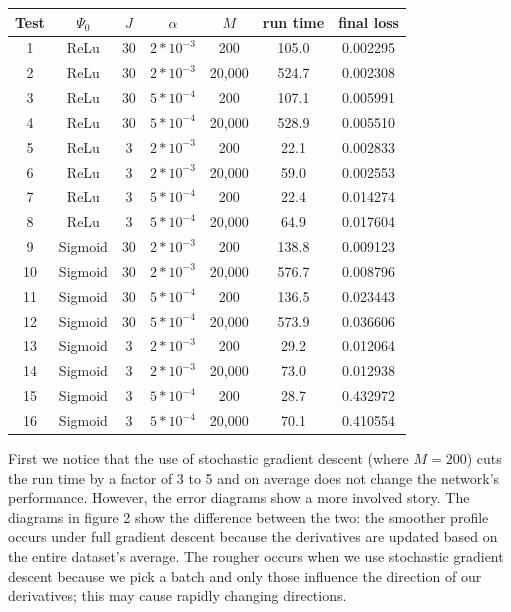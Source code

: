 \documentclass[reqno,14pt]{amsart}
\theoremstyle{plain}
\theoremstyle{definition}
\theoremstyle{remark}
\begin{document}
\begin{center}
\begin{tabular}{||c c c c c c c||} 
 \hline
 Test & $\Psi_0$ & $J$ & $\alpha$ & $M$ & run time & final loss \\ [0.5ex] 
 \hline\hline
 1 & ReLu &  30 & $2*10^{-3}$ & 200 & 105.0 & 0.002295\\ 
 \hline
 2 & ReLu & 30 & $2*10^{-3}$ & 20,000 & 524.7 & 0.002308\\
 \hline
 3 & ReLu & 30 & $5*10^{-4}$ & 200 & 107.1 & 0.005991\\
 \hline
 4 & ReLu & 30 & $5*10^{-4}$ & 20,000 & 528.9 & 0.005510\\
 \hline
 5 & ReLu & 3 & $2*10^{-3}$ & 200 & 22.1 & 0.002833\\
 \hline
 6 & ReLu & 3 & $2*10^{-3}$ & 20,000 & 59.0 & 0.002553\\
 \hline 
 7 & ReLu & 3 & $5*10^{-4}$ & 200 & 22.4 & 0.014274\\
 \hline
 8 & ReLu & 3 & $5*10^{-4}$ & 20,000 & 64.9 & 0.017604\\
 \hline
 9 & Sigmoid &  30 & $2*10^{-3}$ & 200 & 138.8 & 0.009123\\ 
 \hline
 10 & Sigmoid & 30 & $2*10^{-3}$ & 20,000 & 576.7 & 0.008796\\
 \hline
 11 & Sigmoid & 30 & $5*10^{-4}$ & 200 & 136.5 & 0.023443\\
 \hline
 12 & Sigmoid & 30 & $5*10^{-4}$ & 20,000 & 573.9 & 0.036606\\
 \hline
 13 & Sigmoid & 3 & $2*10^{-3}$ & 200 & 29.2 & 0.012064\\
 \hline
 14 & Sigmoid & 3 & $2*10^{-3}$ & 20,000 & 73.0 & 0.012938\\
 \hline 
 15 & Sigmoid & 3 & $5*10^{-4}$ & 200 & 28.7 & 0.432972\\
 \hline
 16 & Sigmoid & 3 & $5*10^{-4}$ & 20,000 & 70.1 & 0.410554\\[1ex] 
 \hline
\end{tabular}
\end{center}

First we notice that the use of stochastic gradient descent (where $M=200$) cuts the run time by a factor of 3 to 5 and on average does not change the network's performance. However, the error diagrams show a more involved story. The diagrams in figure 2 show the difference between the two: the smoother profile occurs under full gradient descent because the derivatives are updated based on the entire dataset's average. The rougher occurs when we use stochastic gradient descent because we pick a batch and only those influence the direction of our derivatives; this may cause rapidly changing directions.\\
\end{document}
